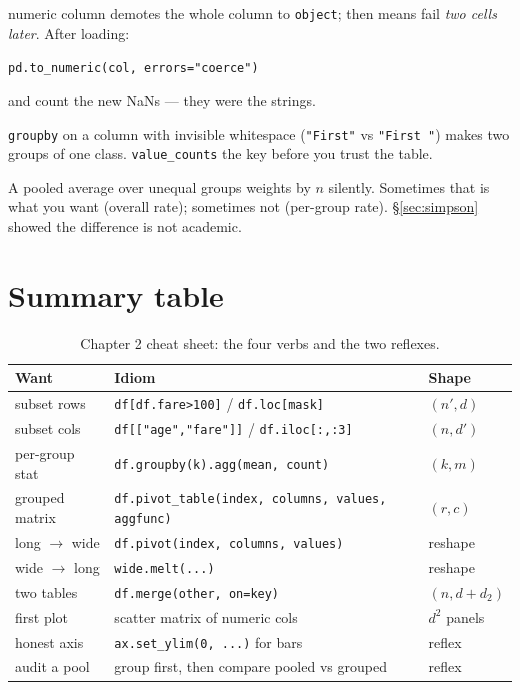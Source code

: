 \begin{description}
  numeric column demotes the whole column to \texttt{object}; then means
  fail \emph{two cells later}. After loading:
  \par\texttt{pd.to\_numeric(col, errors="coerce")}
  \par\noindent and count the new NaNs --- they were the strings.
\item[Aggregating before checking the index] \texttt{groupby} on a column
  with invisible whitespace (\texttt{"First"} vs \texttt{"First "}) makes
  two groups of one class. \texttt{value\_counts} the key before you trust
  the table.
\item[Forgetting the weights] A pooled average over unequal groups weights
  by $n$ silently. Sometimes that is what you want (overall rate);
  sometimes not (per-group rate). \S\ref{sec:simpson} showed the difference
  is not academic.
\end{description}

\section{Summary table}

\begin{table}[ht]\centering\small
\begin{tabularx}{\linewidth}{@{}l X l@{}}
\toprule
\textbf{Want} & \textbf{Idiom} & \textbf{Shape} \\
\midrule
subset rows & \texttt{df[df.fare>100]} / \texttt{df.loc[mask]} & $(n',d)$ \\
subset cols & \texttt{df[["age","fare"]]} / \texttt{df.iloc[:,:3]} & $(n,d')$ \\
per-group stat & \texttt{df.groupby(k).agg(mean, count)} & $(k,m)$ \\
grouped matrix & \texttt{df.pivot\_table(index, columns, values, aggfunc)} & $(r,c)$ \\
long $\to$ wide & \texttt{df.pivot(index, columns, values)} & reshape \\
wide $\to$ long & \texttt{wide.melt(...)} & reshape \\
two tables & \texttt{df.merge(other, on=key)} & $(n, d{+}d_2)$ \\
first plot & scatter matrix of numeric cols & $d^2$ panels \\
honest axis & \texttt{ax.set\_ylim(0, ...)} for bars & reflex \\
audit a pool & group first, then compare pooled vs grouped & reflex \\
\bottomrule
\end{tabularx}
\caption{Chapter 2 cheat sheet: the four verbs and the two reflexes.}\label{tab:cheat2}
\end{table}

